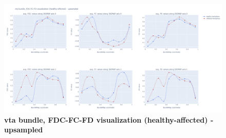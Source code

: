 \documentclass[thesis.tex]{subfiles}
\begin{document}
\begin{figure}
  \centering
  \includegraphics[width=24cm]{thesis_radomskyi/apendix/vta bundle, FDC-FC-FD visualization (healthy-affected) - upsampled.png}
    \caption{\textbf{vta bundle, FDC-FC-FD visualization (healthy-affected) - upsampled}}
\end{figure}
\end{document}
